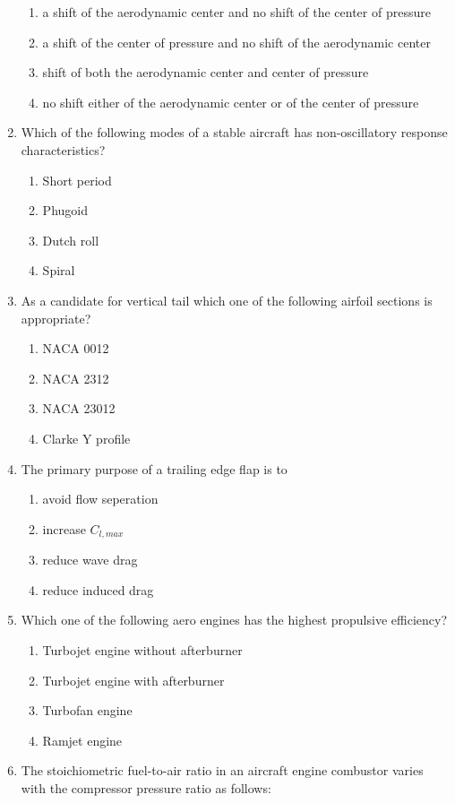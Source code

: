 \documentclass[journal,12pt,onecolumn]{IEEEtran}
\theoremstyle{remark}
\begin{document}
\begin{enumerate}
\begin{enumerate}
  \item a shift of the aerodynamic center and no shift of the center of pressure
  \item a shift of the center of pressure and no shift of the aerodynamic center
  \item shift of both the aerodynamic center and center of pressure
  \item no shift either of the aerodynamic center or of the center of pressure
  \end{enumerate}
 \item Which of the following modes of a stable aircraft has non-oscillatory response characteristics?
   \begin{enumerate}
  \item Short period
  \item Phugoid
  \item Dutch roll
  \item Spiral
  \end{enumerate}
 \item As a candidate for vertical tail which one of the following airfoil sections is appropriate?
   \begin{enumerate}
  \item NACA 0012
  \item NACA 2312
  \item NACA 23012
  \item Clarke Y profile
  \end{enumerate}
 \item The primary purpose of a trailing edge flap is to
   \begin{enumerate}
  \item avoid flow seperation
  \item increase $C_{l,max}$
  \item reduce wave drag
  \item reduce induced drag
  \end{enumerate}
 \item Which one of the following aero engines has the highest propulsive efficiency?
   \begin{enumerate}
  \item Turbojet engine without afterburner
  \item Turbojet engine with afterburner 
  \item Turbofan engine
  \item Ramjet engine
  \end{enumerate}
 \item The stoichiometric fuel-to-air ratio in an aircraft engine combustor varies with the compressor pressure ratio as follows:

\end{enumerate}
\end{document}
